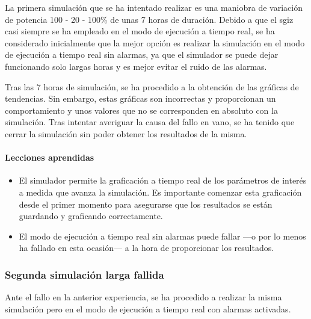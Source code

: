 La primera simulación que se ha intentado realizar es una maniobra de variación de potencia 100 - 20 - 100\% de unas 7 horas de duración. Debido a que el \acrshort{sgiz} casi siempre se ha empleado en el modo de ejecución a tiempo real, se ha considerado inicialmente que la mejor opción es realizar la simulación en el modo de ejecución a tiempo real sin alarmas, ya que el simulador se puede dejar funcionando solo largas horas y es mejor evitar el ruido de las alarmas.

Tras las 7 horas de simulación, se ha procedido a la obtención de las gráficas de tendencias. Sin embargo, estas gráficas son incorrectas y proporcionan un comportamiento y unos valores que no se corresponden en absoluto con la simulación. Tras intentar averiguar la causa del fallo en vano, se ha tenido que cerrar la simulación sin poder obtener los resultados de la misma.

\paragraph{Lecciones aprendidas}

\begin{itemize}
  \item El simulador permite la graficación a tiempo real de los parámetros de interés a medida que avanza la simulación. Es importante comenzar esta graficación desde el primer momento para asegurarse que los resultados se están guardando y graficando correctamente.
  \item El modo de ejecución a tiempo real sin alarmas puede fallar ---o por lo menos ha fallado en esta ocasión--- a la hora de proporcionar los resultados.
\end{itemize}

\subsubsection{Segunda simulación larga fallida} \label{sim_larga_fallida}

Ante el fallo en la anterior experiencia, se ha procedido a realizar la misma simulación pero en el modo de ejecución a tiempo real con alarmas activadas.

